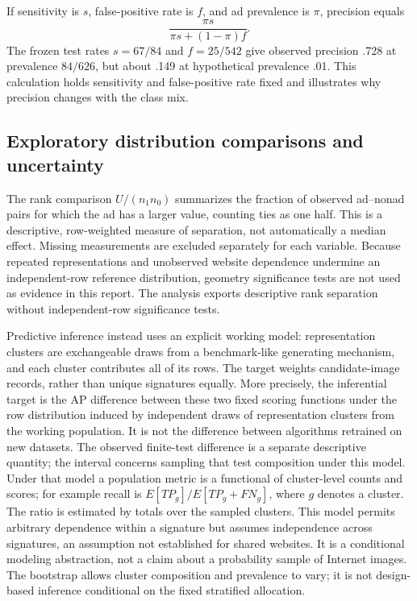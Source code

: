 \documentclass[11pt,a4paper]{article}
\begin{document}
If sensitivity is $s$, false-positive rate is $f$, and ad prevalence is $\pi$, precision equals
\[\frac{\pi s}{\pi s+(1-\pi)f}.\]
The frozen test rates $s=67/84$ and $f=25/542$ give observed precision .728 at prevalence $84/626$, but about .149 at hypothetical prevalence .01. This calculation holds sensitivity and false-positive rate fixed and illustrates why precision changes with the class mix.

\subsection{Exploratory distribution comparisons and uncertainty}
The rank comparison $U/(n_1n_0)$ summarizes the fraction of observed ad--nonad pairs for which the ad has a larger value, counting ties as one half. This is a descriptive, row-weighted measure of separation, not automatically a median effect. Missing measurements are excluded separately for each variable. Because repeated representations and unobserved website dependence undermine an independent-row reference distribution, geometry significance tests are not used as evidence in this report. The analysis exports descriptive rank separation without independent-row significance tests.

Predictive inference instead uses an explicit working model: representation clusters are exchangeable draws from a benchmark-like generating mechanism, and each cluster contributes all of its rows. The target weights candidate-image records, rather than unique signatures equally. More precisely, the inferential target is the AP difference between these two fixed scoring functions under the row distribution induced by independent draws of representation clusters from the working population. It is not the difference between algorithms retrained on new datasets. The observed finite-test difference is a separate descriptive quantity; the interval concerns sampling that test composition under this model. Under that model a population metric is a functional of cluster-level counts and scores; for example recall is $E[TP_g]/E[TP_g+FN_g]$, where $g$ denotes a cluster. The ratio is estimated by totals over the sampled clusters. This model permits arbitrary dependence within a signature but assumes independence across signatures, an assumption not established for shared websites. It is a conditional modeling abstraction, not a claim about a probability sample of Internet images. The bootstrap allows cluster composition and prevalence to vary; it is not design-based inference conditional on the fixed stratified allocation.
\end{document}
